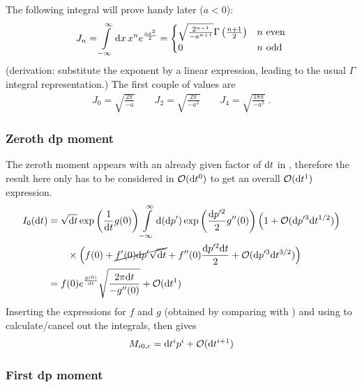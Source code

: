 The following integral will prove handy later (\(a < 0\)):
\begin{align}
	\label{eqn:gaussian_moments}
	J_n = \int\limits_{-\infty}^\infty \mathrm{d} x \, x^n e^{\frac{a x^2}2}
	=
	\begin{cases}
		\sqrt{\frac{2^{n-1}}{-a^{n+1}}} \Gamma\left(\frac{n+1}2\right)
			& n \text{ even}
		\\
		0 & n \text{ odd}
	\end{cases}
\end{align}
(derivation: substitute the exponent by a linear expression, leading to the usual \(\Gamma\) integral representation.) The first couple of values are
\begin{align}
	J_0 = \sqrt{\frac{2\pi}{-a}}
	\qquad
	J_2 = \sqrt{\frac{2\pi}{-a^3}}
	\qquad
	J_4 = \sqrt{\frac{18\pi}{-a^5}} ~.
\end{align}


\subsubsection{Zeroth dp moment}

The zeroth moment appears with an already given factor of \(\mathrm{d} t\) in , therefore the result here only has to be considered in \(\mathcal{O}(\mathrm{d} t^0)\) to get an overall \(\mathcal{O}(\mathrm{d} t^1)\) expression.
%
\begin{align*}
	I_0(\mathrm{d} t)
	&=
	\sqrt{\mathrm{d} t}\operatorname{exp}\left(\frac1{\mathrm{d} t}g(0)\right)
	\int\limits_{-\infty}^\infty\mathrm{d}(\mathrm{d} p')\operatorname{exp}\left(\frac{\mathrm{d} p'^2}2g''(0)\right)
	\left(1+\mathcal{O}(\mathrm{d} p'^3\mathrm{d} t^{1/2})\right)
	\\&\qquad
	\times\Bigl(
	f(0)
	+ \cancel{f'(0)\mathrm{d} p'\sqrt{\mathrm{d} t}}
	+ f''(0)\frac{\mathrm{d} p'^2\mathrm{d} t}2
	+ \mathcal{O}(\mathrm{d} p'^3\mathrm{d} t^{3/2})
	\Bigr)
	\\
	&= f(0)e^{\frac{g(0)}{\mathrm{d} t}}\sqrt{\frac{2\pi\mathrm{d} t}{-g''(0)}} + \mathcal{O}(\mathrm{d} t^1)
\end{align*}
%
Inserting the expressions for \(f\) and \(g\) (obtained by comparing  with ) and using  to calculate/cancel out the integrals, then gives
%
\begin{align}
	M_{i0,c} = \mathrm{d} t^i p^i + \mathcal{O}(\mathrm{d} t^{i+1})
\end{align}

\subsubsection{First dp moment}

